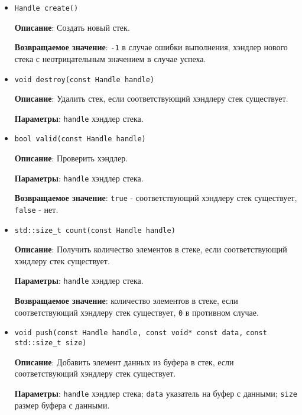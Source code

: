 \documentclass[14pt]{extarticle}
\begin{document}
        \begin{itemize}

            \item \verb|Handle create()|

                \textbf{Описание}: Создать новый стек.

                \textbf{Возвращаемое значение}: \texttt{-1} в случае ошибки выполнения,
                хэндлер нового стека с неотрицательным значением в случае успеха.

            \item \verb|void destroy(const Handle handle)|

                \textbf{Описание}: Удалить стек, если соответствующий хэндлеру
                стек существует.

                \textbf{Параметры}: \texttt{handle} \textemdash \space хэндлер стека.

            \item \verb|bool valid(const Handle handle)|

                \textbf{Описание}: Проверить хэндлер.

                \textbf{Параметры}: \texttt{handle} \textemdash \space хэндлер стека.

                \textbf{Возвращаемое значение}: \texttt{true} - соответствующий
                хэндлеру стек существует, \texttt{false} - нет.

            \item \verb|std::size_t count(const Handle handle)|

                \textbf{Описание}: Получить количество элементов в стеке, если
                соответствующий хэндлеру стек существует.

                \textbf{Параметры}: \texttt{handle} \textemdash \space хэндлер стека.

                \textbf{Возвращаемое значение}: количество элементов в стеке, если
                соответствующий хэндлеру стек существует, \texttt{0} в противном случае.

            \item \verb|void push(const Handle handle, const void* const data,| \break
                \verb|const std::size_t size)|

                \textbf{Описание}: Добавить элемент данных из буфера в стек, если
                соответствующий хэндлеру стек существует.

                \textbf{Параметры}: \texttt{handle} \textemdash \space хэндлер стека; \hfill \break
                \texttt{data} \textemdash \space указатель на буфер с данными; \hfill \break
                \texttt{size} \textemdash \space размер буфера с данными.


\end{itemize}
\end{document}
